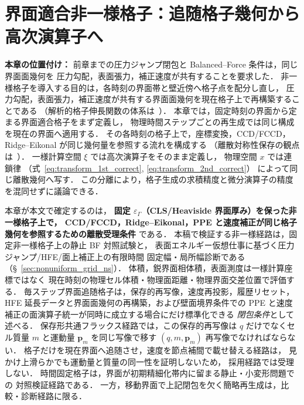 \section{界面適合非一様格子：追随格子幾何から高次演算子へ}
\label{sec:grid}

\noindent\textbf{本章の位置付け：}
前章までの圧力ジャンプ閉包と Balanced--Force 条件は，同じ界面面幾何を
圧力勾配，表面張力，補正速度が共有することを要求した．
非一様格子を導入する目的は，各時刻の界面帯と壁近傍へ格子点を配分し直し，
圧力勾配，表面張力，補正速度が共有する界面面幾何を現在格子上で再構築することである
（解析的格子伸長関数の体系は~\cite{Vinokur1983}）．
本章では，固定時刻の界面から定まる界面適合格子をまず定義し，
物理時間ステップごとの再生成では同じ構成を現在の界面へ適用する．
その各時刻の格子上で，座標変換，CCD/FCCD，Ridge--Eikonal が同じ幾何量を参照する流れを構成する
（離散対称性保存の観点は~\cite{VerstappenVeldman2003}）．
一様計算空間 $\xi$ では高次演算子をそのまま定義し，
物理空間 $x$ では連鎖律
（式~\eqref{eq:transform_1st_correct}, \eqref{eq:transform_2nd_correct}）
によって同じ離散幾何へ写す．
この分離により，格子生成の求積精度と微分演算子の精度を混同せずに議論できる．

\begin{tcolorbox}[warnbox, title={非一様格子の適用範囲}]
\label{box:nonuniform_scope_contract}
本章が本文で確定するのは，
\textbf{固定 $\varepsilon_\Gamma$（CLS/Heaviside 界面厚み）を保った非一様格子上で，
CCD/FCCD，Ridge--Eikonal，PPE と速度補正が同じ格子幾何を参照するための離散受理条件}
である．
本稿で検証する非一様経路は，固定非一様格子上の静止 BF 対照試験と，
表面エネルギー仮想仕事に基づく圧力ジャンプ/HFE/面上補正上の有限時間
固定幅・局所幅診断である（§~\ref{sec:nonuniform_grid_ns}）．
体積，鋭界面相体積，表面測度は一様計算座標ではなく
現在時刻の物理セル体積・物理面距離・物理界面交差位置で評価する．
毎ステップ界面追随格子は，保存的再写像，速度再投影，履歴リセット，
HFE 延長データと界面面幾何の再構築，および壁面境界条件での
PPE と速度補正の面演算子統一が同時に成立する場合にだけ標準化できる
\emph{閉包条件}として述べる．
保存形共通フラックス経路では，この保存的再写像は
$q$ だけでなくセル質量 $m$ と運動量 $\bm{p}_m$ を同じ写像で移す
$(q,m,\bm{p}_m)$ 再写像でなければならない．
格子だけを現在界面へ追随させ，速度を節点補間で載せ替える経路は，
見かけ上滑らかでも運動量と質量の同一性を証明しないため，
採用経路では受理しない．
時間固定格子は，界面が初期精細化帯内に留まる静止・小変形問題での
対照検証経路である．
一方，移動界面で上記閉包を欠く簡略再生成は，比較・診断経路に限る．
\end{tcolorbox}

